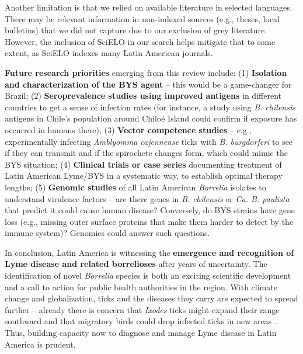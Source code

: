 \documentclass[11pt,letterpaper]{article}
\begin{document}
Another limitation is that we relied on available literature in selected languages. There may be relevant information in non-indexed sources (e.g., theses, local bulletins) that we did not capture due to our exclusion of grey literature. However, the inclusion of SciELO in our search helps mitigate that to some extent, as SciELO indexes many Latin American journals.

\textbf{Future research priorities} emerging from this review include: (1) \textbf{Isolation and characterization of the BYS agent} – this would be a game-changer for Brazil; (2) \textbf{Seroprevalence studies using improved antigens} in different countries to get a sense of infection rates (for instance, a study using \textit{B. chilensis} antigens in Chile’s population around Chiloé Island could confirm if exposure has occurred in humans there); (3) \textbf{Vector competence studies} – e.g., experimentally infecting \textit{Amblyomma cajennense} ticks with \textit{B. burgdorferi} to see if they can transmit and if the spirochete changes form, which could mimic the BYS situation; (4) \textbf{Clinical trials or case series} documenting treatment of Latin American Lyme/BYS in a systematic way, to establish optimal therapy lengths; (5) \textbf{Genomic studies} of all Latin American \textit{Borrelia} isolates to understand virulence factors – are there genes in \textit{B. chilensis} or \textit{Ca. B. paulista} that predict it could cause human disease? Conversely, do BYS strains have gene loss (e.g., missing outer surface proteins that make them harder to detect by the immune system)? Genomics could answer such questions.

In conclusion, Latin America is witnessing the \textbf{emergence and recognition of Lyme disease and related borrelioses} after years of uncertainty. The identification of novel \textit{Borrelia} species is both an exciting scientific development and a call to action for public health authorities in the region. With climate change and globalization, ticks and the diseases they carry are expected to spread further – already there is concern that \textit{Ixodes} ticks might expand their range southward and that migratory birds could drop infected ticks in new areas \citep{Binetruy2020l, Binetruy2020m}. Thus, building capacity now to diagnose and manage Lyme disease in Latin America is prudent.
\end{document}
